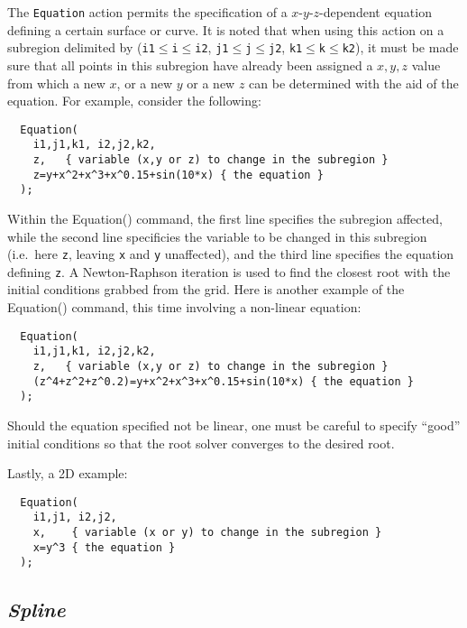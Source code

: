 \documentclass{warpdoc}
\begin{document}
The \verb|Equation| action permits the specification
of a $x$-$y$-$z$-dependent equation defining a certain
surface or curve. It is noted that
when using this action on a subregion delimited by
(\verb|i1|$\leq$\verb|i|$\leq$\verb|i2|,
  \verb|j1|$\leq$\verb|j|$\leq$\verb|j2|,
  \verb|k1|$\leq$\verb|k|$\leq$\verb|k2|),
it must be made sure that all points in this subregion have already been
assigned a $x, y, z$ value from which a new $x$, or a new $y$ or a
new $z$ can be determined with the aid of the equation.
For example, consider the following:
%
\begin{verbatim}
  Equation(
    i1,j1,k1, i2,j2,k2,
    z,   { variable (x,y or z) to change in the subregion }
    z=y+x^2+x^3+x^0.15+sin(10*x) { the equation }
  );
\end{verbatim}
%
Within the Equation() command, the first line specifies the subregion affected, 
while the second line  specificies  the variable to be
changed in this subregion (i.e.\ here  \verb|z|, leaving \verb|x| and \verb|y|
unaffected), and the third line specifies the equation defining \verb|z|. A Newton-Raphson 
iteration is used to find the closest root with the initial conditions grabbed
from the grid. Here is another example of the Equation() command, this time involving
a non-linear equation:
%
\begin{verbatim}
  Equation(
    i1,j1,k1, i2,j2,k2,
    z,   { variable (x,y or z) to change in the subregion }
    (z^4+z^2+z^0.2)=y+x^2+x^3+x^0.15+sin(10*x) { the equation }
  );
\end{verbatim}
%
Should the equation specified not be linear, one must be 
careful to specify ``good'' initial conditions so that the root solver converges to the desired
root. 

Lastly, a 2D example:
%
\begin{verbatim}
  Equation(
    i1,j1, i2,j2,
    x,    { variable (x or y) to change in the subregion }
    x=y^3 { the equation }
  );
\end{verbatim}
%


\subsection{\emph{Spline}}
\end{document}

